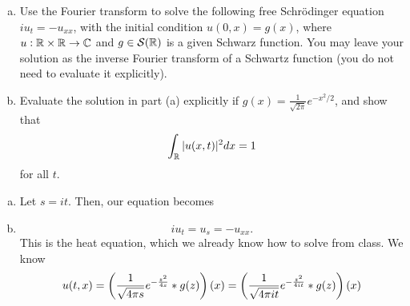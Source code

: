 \documentclass{article}
\begin{document}
\newpage
{} 
\begin{enumerate}[(a)]
    \item Use the Fourier transform to solve the following free Schr\" odinger equation $iu_t = -u_{xx}$,
    with the initial condition $u(0,x) = g(x)$, where $u : \mathbb{R}\times \mathbb{R} \to \mathbb{C}$ and $g \in \mathcal{S}(\mathbb{R})$ is a given Schwarz function.
    You may leave your solution as the inverse Fourier transform of a Schwartz function (you do not need
    to evaluate it explicitly).
    \item  Evaluate the solution in part (a) explicitly if $g(x) = \frac{1}{\sqrt{2\pi}} e^{-x^2/
    2}$, and show that 
    \[\int_{\mathbb{R}}|u(x,t)|^2dx = 1\] for
    all $t$.
\end{enumerate}
\tri
\hop 
\solution
\begin{enumerate}[(a)]
    \item Let $s = it$. Then, our equation becomes 
    \item \[iu_t = u_s = -u_{xx}.\]
    This is the heat equation, which we already know how to solve from class. We know 
    \begin{align*}
        u(t,x) = \del{\frac{1}{\sqrt{4\pi s}}e^{-\frac{z^2}{4s}}* g(z)}(x) =\del{\frac{1}{\sqrt{4\pi i t}}e^{-\frac{z^2}{4it}}* g(z)}(x)
    \end{align*}
\end{enumerate}
\end{document}
